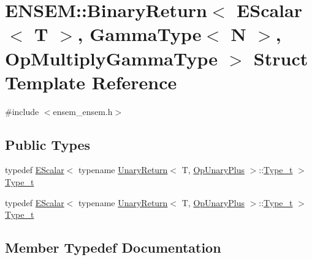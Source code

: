 \hypertarget{structENSEM_1_1BinaryReturn_3_01EScalar_3_01T_01_4_00_01GammaType_3_01N_01_4_00_01OpMultiplyGammaType_01_4}{}\section{E\+N\+S\+EM\+:\+:Binary\+Return$<$ E\+Scalar$<$ T $>$, Gamma\+Type$<$ N $>$, Op\+Multiply\+Gamma\+Type $>$ Struct Template Reference}
\label{structENSEM_1_1BinaryReturn_3_01EScalar_3_01T_01_4_00_01GammaType_3_01N_01_4_00_01OpMultiplyGammaType_01_4}


{\ttfamily \#include $<$ensem\+\_\+ensem.\+h$>$}

\subsection*{Public Types}
\begin{DoxyCompactItemize}
\item 
typedef \mbox{\hyperlink{classENSEM_1_1EScalar}{E\+Scalar}}$<$ typename \mbox{\hyperlink{structENSEM_1_1UnaryReturn}{Unary\+Return}}$<$ T, \mbox{\hyperlink{structENSEM_1_1OpUnaryPlus}{Op\+Unary\+Plus}} $>$\+::\mbox{\hyperlink{structENSEM_1_1BinaryReturn_3_01EScalar_3_01T_01_4_00_01GammaType_3_01N_01_4_00_01OpMultiplyGammaType_01_4_a6ea5f421f71c1cf3afab8ce6d642b9dc}{Type\+\_\+t}} $>$ \mbox{\hyperlink{structENSEM_1_1BinaryReturn_3_01EScalar_3_01T_01_4_00_01GammaType_3_01N_01_4_00_01OpMultiplyGammaType_01_4_a6ea5f421f71c1cf3afab8ce6d642b9dc}{Type\+\_\+t}}
\item 
typedef \mbox{\hyperlink{classENSEM_1_1EScalar}{E\+Scalar}}$<$ typename \mbox{\hyperlink{structENSEM_1_1UnaryReturn}{Unary\+Return}}$<$ T, \mbox{\hyperlink{structENSEM_1_1OpUnaryPlus}{Op\+Unary\+Plus}} $>$\+::\mbox{\hyperlink{structENSEM_1_1BinaryReturn_3_01EScalar_3_01T_01_4_00_01GammaType_3_01N_01_4_00_01OpMultiplyGammaType_01_4_a6ea5f421f71c1cf3afab8ce6d642b9dc}{Type\+\_\+t}} $>$ \mbox{\hyperlink{structENSEM_1_1BinaryReturn_3_01EScalar_3_01T_01_4_00_01GammaType_3_01N_01_4_00_01OpMultiplyGammaType_01_4_a6ea5f421f71c1cf3afab8ce6d642b9dc}{Type\+\_\+t}}
\end{DoxyCompactItemize}


\subsection{Member Typedef Documentation}
\mbox{\label{structENSEM_1_1BinaryReturn_3_01EScalar_3_01T_01_4_00_01GammaType_3_01N_01_4_00_01OpMultiplyGammaType_01_4_a6ea5f421f71c1cf3afab8ce6d642b9dc}} 
